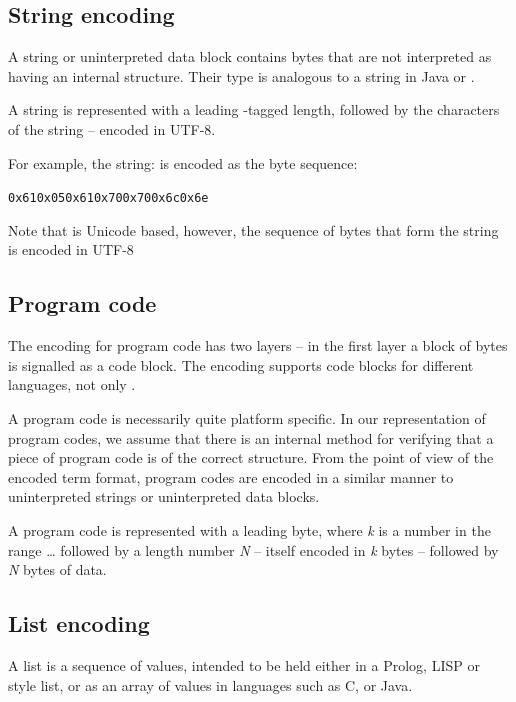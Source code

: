 \subsection{String encoding}
\label{encoded:string}

A string or uninterpreted data block contains bytes that are not interpreted as having an internal structure. Their type is analogous to a string in Java or \go.

A string is represented with a leading -tagged length, followed by the characters of the string -- encoded in UTF-8.

For example, the string:  is encoded as the byte sequence:

\begin{alltt}
0x61 0x05 0x61 0x70 0x70 0x6c 0x6e
\end{alltt}
Note that \go is Unicode based, however, the sequence of bytes that form the string is encoded in UTF-8

\subsection{Program code}
\label{encoded:code}

The encoding for program code has two layers -- in the first layer a block of bytes is signalled as a code block. The encoding supports code blocks for different languages, not only \go.

A program code is necessarily quite platform specific. In our representation of program codes, we assume that there is an internal method for verifying that a piece of program code is of the correct structure. From the point of view of the encoded term format, program codes are encoded in a similar manner to uninterpreted strings or uninterpreted data blocks.

A program code is represented with a leading  byte, where \emph{k} is a number in the range \ldots{} followed by a length number \emph{N} -- itself encoded in \emph{k} bytes -- followed by \emph{N} bytes of data.


\subsection{List encoding}
\label{encoded:list}

A list is a sequence of values, intended to be held either in a Prolog, LISP or \go style list, or as an array of values in languages such as C, or Java.

